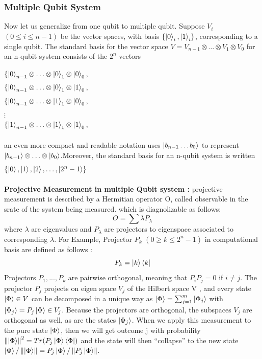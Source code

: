\documentclass[11 pt]{article}
\theoremstyle{definition}
\theoremstyle{remark}
\newcommand\norm[1]{\left\lVert#1\right\rVert}
\newcommand{\tens}[1]{
  \mathbin{\mathop{\otimes}\limits_{#1}}}
\begin{document}
\subsubsection{Multiple Qubit System}
Now let us generalize from one qubit to multiple qubit. Suppose $V_i$ $(0 \leq i \leq n-1) $ be the vector spaces, with basis $\{\ket{0}_i,\ket{1}_i\}$, corresponding to a single qubit. The standard basis for the vector space $V = V_{n-1} \tens{} \hdots \tens{} V_1 \tens{} V_0$ for an n-qubit system consists of the $2^n$ vectors
\begin{center}
$\{\ket{0}_{n-1} \tens{} \hdots \tens{} \ket{0}_1 \tens{} \ket{0}_0,$\\
$\{\ket{0}_{n-1} \tens{} \hdots \tens{} \ket{0}_1 \tens{} \ket{1}_0,$\\
$\{\ket{0}_{n-1} \tens{} \hdots \tens{} \ket{1}_1 \tens{} \ket{0}_0,$\\
$\vdots$\\
$\{\ket{1}_{n-1} \tens{} \hdots \tens{} \ket{1}_1 \tens{} \ket{1}_0,$\\
\end{center}
an even more compact and readable notation uses $\ket{b_{n-1} \hdots b_0}$ to represent $\ket{b_{n-1}} \tens{} \hdots \tens{} \ket{b_0}$.Moreover, the standard basis for an n-qubit system is written $\{\ket{0},\ket{1},\ket{2},\hdots,\ket{{2^n}-1}\}$
\\
\\
\textbf{Projective Measurement in multiple Qubit system : }
projective measurement is described by a Hermitian operator O, called observable in the srate of the system being measured. which is diagnolizable as follows:
$$O = \sum \lambda P_{\lambda}$$ where $\lambda$ are eigenvalues and $P_{\lambda}$ are projectors to eigenspace associated to corresponding $\lambda$. 
For Example, Projector $P_k$ $(0\geq k \leq 2^n-1)$ in computational basis are defined as follows : $$P_k = \ket{k}\bra{k}$$
Projectors $P_1, . . . , P_k$  are pairwise orthogonal, meaning that $P_iP_j = 0$ if
$i \neq j$.
The projector $P_j$ projects on eigen space $V_j$ of the Hilbert space V , and every state
$\ket{\Phi} \in V$ can be decomposed in a unique way as $\ket{\Phi}= \sum_{j=1}^{m}\ket{\Phi_j}
 $ with $\ket{\Phi_j} = P_j\ket{\Phi} \in V_j$. Because the
projectors are orthogonal, the subspaces $V_j$ are orthogonal as well, as are the states $\ket{\Phi_j}$. When we
apply this measurement to the pure state $\ket{\Phi}$, then we will get outcome j with probability $\norm{\ket{\Phi}}^2 = Tr(P_j\ket{\Phi}\bra{\Phi}) $ and the state will then “collapse” to the new state $\ket{\Phi}/\norm{\ket{\Phi}}=P_j\ket{\Phi}/\norm{P_j\ket{\Phi}}$.
\end{document}
